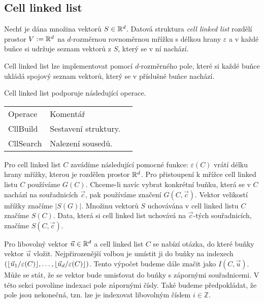 \subsection{Cell linked list}

\label{defi:cll}
\begin{defi}
  Nechť je dána množina vektorů $S \in \mathbb{R}^d$. Datová struktura \textit{cell linked list} rozdělí prostor $V := \mathbb{R}^d$ na $d$-rozměrnou rovnoměrnou mřížku s délkou hrany $\varepsilon$ a v každé buňce si udržuje seznam vektorů z $S$, který se v ní nachází.\cite[s.~149--152]{computer_simulation_of_liquids}
\end{defi}

Cell linked list lze implementovat pomocí $d$-rozměrného pole, které si každé buňce ukládá spojový seznam vektorů, který se v příslušné buňce nachází.

\noindent Cell linked list podporuje následující operace.

\begin{table}[ht!]
  \begin{tabular}{lll}
    Operace & Komentář\\
    CllBuild & Sestavení struktury.\\
    CllSearch & Nalezení sousedů.\\
  \end{tabular}
\end{table}

Pro cell linked list $C$ zavádíme následující pomocné funkce: $\varepsilon(C)$ vrátí délku hrany mřížky, kterou je rozdělen prostor $\mathbb{R}^d$. Pro přistoupení k mřížce cell linked listu $C$ používáme $G(C)$. Chceme-li navíc vybrat konkrétní buňku, která se v $C$ nachází na souřadnicích $\vec{c}$, pak používáme značení $G(C, \vec{c})$. Vektor velikostí mřížky značíme $|S(G)|$. Množinu vektorů $S$ uchovávána v cell linked listu $C$ značíme $S(C)$. Data, která si cell linked list uchovává na $\vec{c}$-tých souřadnicích, značíme $S(C, \vec{c})$.

Pro libovolný vektor $\vec{u} \in \mathbb{R}^d$ a cell linked list $C$ se nabízí otázka, do které buňky vektor $\vec{u}$ vložit. Nejpřirozenější volbou je umístit ji do buňky na indexech $(\lfloor\vec{u}_1/\varepsilon(C)\rfloor, \ldots, \lfloor\vec{u}_d/\varepsilon(C)\rfloor)$. Tento výpočet budeme dále značit jako $I(C, \vec{u})$. Může se stát, že se vektor bude umisťovat do buňky s zápornými souřadnicemi. V této sekci povolíme indexaci pole zápornými čísly. Také budeme předpokládat, že pole jsou nekonečná, tzn. lze je indexovat libovolným číslem $i \in \mathbb{Z}$.

